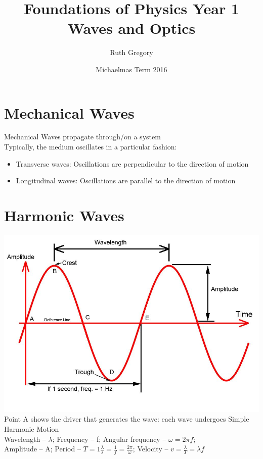 \documentclass[a4paper, 11pt, fleqn, normalem]{report}
\title{Foundations of Physics Year 1 \\ Waves and Optics \vspace{-20pt}}
\author{Ruth Gregory}
\date{\vspace{-15pt}Michaelmas Term 2016}
\begin{document}
\maketitle
\thispagestyle{fancy}

\tableofcontents

\newpage
\section{Mechanical Waves}
Mechanical Waves propagate through/on a system \\
Typically, the medium oscillates in a particular fashion:
\begin{itemize}
    \item Transverse waves: Oscillations are perpendicular to the direction of motion
    \item Longitudinal waves: Oscillations are parallel to the direction of motion
\end{itemize}

\section{Harmonic Waves}
\includegraphics[scale=0.3]{Sine.jpg} \\
Point A shows the driver that generates the wave: each wave undergoes Simple Harmonic Motion \\
Wavelength -- $\lambda$; Frequency -- f; Angular frequency -- $\omega = 2{\pi}f$; \\
Amplitude -- A; Period -- $T = 1 \frac{\lambda}{s} = \frac{1}{f} = \frac{2\pi}{\omega}$; Velocity -- $v = \frac{\lambda}{T} = {\lambda}f$
\end{document}
